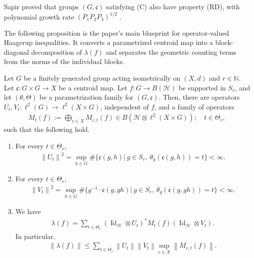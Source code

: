 \documentclass[12pt,reqno]{amsart}
\newcommand{\N}{\mathbb{N}}
\newcommand{\norm}[1]{\left\|#1\right\|}
\newcommand{\Id}{\operatorname{Id}}
\newcommand{\Hil}{\mathcal{H}}
\numberwithin{equation}{section}
\begin{document}
Sapir proved that groups $(G,\mathfrak{c})$ satisfying (C) also have property (RD), with polynomial growth rate $(P_1P_2P_3)^{1/2}$ \cite[Theorem 2.3]{Sapir2015centroids}.

The following proposition is the paper's main blueprint for operator-valued Haagerup inequalities. It converts a parametrized centroid map into a block-diagonal decomposition of $\lambda(f)$ and separates the geometric counting terms from the norms of the individual blocks.
\begin{proposition}\label{proposition: main decomposition-Haagerup}
    Let $G$ be a finitely generated group acting isometrically on $(X,d)$ and $r\in \N$. Let $\mathfrak{c}: G\times G\to X$ be a centroid map.
    Let $f:G\to B(\Hil)$ be supported in $S_r$, and let $(\theta,\Theta)$ be a parametrization family for $(G,\mathfrak{c})$.
    Then, there are operators $U_t,V_t:\ell^2(G)\to\ell^2(X\times G)$, independent of $f$, and a family of operators  
    \begin{align}\label{equation: M_x}
        M_t(f):=\bigoplus_{c\in X}M_{c,t}(f) \in B(\Hil\otimes \ell^2(X\times G));\quad t\in \Theta_r,
    \end{align}
    such that the following hold.
    \begin{enumerate}[label=(\thetheorem.\arabic*)]
        \item\label{item: norm of U} For every $t\in \Theta_r$, 
        \begin{align*}
            \norm{U_t}^2=\sup_{h\in G}\#\{\mathfrak{c}(g,h)|\ g\in S_r,\ \theta_g(\mathfrak{c}(g,h))=t\}<\infty.
        \end{align*}
        \item\label{item: norm of V} For every $t\in \Theta_r$,
        \begin{align*}
            \norm{V_t}^2=\sup_{h\in G}\#\{g^{-1}\cdot \mathfrak{c}(g,gh)|\ g\in S_r,\ \theta_g(\mathfrak{c}(g,gh))=t\}<\infty.
        \end{align*}
        \item\label{item: decomposition} We have 
        \begin{align*}
            \lambda(f)=\sum_{t\in \Theta_r}(\Id_{\Hil}\otimes U_t)^* M_{t}(f)(\Id_{\Hil}\otimes V_t).
        \end{align*}
        In particular,
        \begin{align*}
            \norm{\lambda(f)}\le \sum_{t\in \Theta_r}\norm{U_t}\norm{V_t}\sup_{c\in X}\norm{M_{c,t}(f)}.
        \end{align*}
    \end{enumerate}
\end{proposition}
\end{document}
